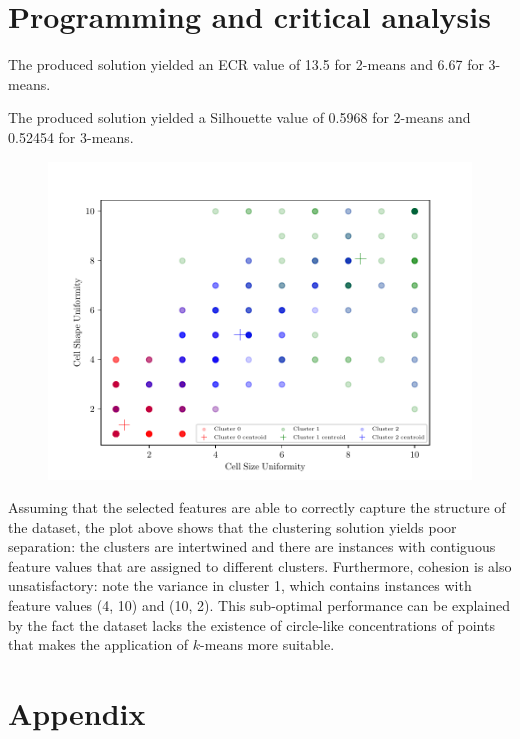 \documentclass{exam}
\begin{document}
    \section{Programming and critical analysis}
    \begin{questions}
        \setcounter{question}{3}
        \item \quad
        \begin{parts}
            \vspace{-1.6em}
            \item The produced solution yielded an ECR value of 13.5 for 2-means and 6.67 for 3-means.
            \item The produced solution yielded a Silhouette value of 0.5968 for 2-means and 0.52454 for 3-means. 
        \end{parts}
        \item \quad
        \vspace{-1.2em}
        \begin{figure}[H]
            \centering
            \includegraphics{3means.pdf}
        \end{figure}
        \item Assuming that the selected features are able to correctly capture the structure of the dataset, the plot above shows that the clustering solution yields poor separation: the clusters are intertwined and there are instances with contiguous feature values that are assigned to different clusters. Furthermore, cohesion is also unsatisfactory: note the variance in cluster 1, which contains instances with feature values (4, 10) and (10, 2). This sub-optimal performance can be explained by the fact the dataset lacks the existence of circle-like concentrations of points that makes the application of $k$-means more suitable. 
    \end{questions}

    \pagebreak
    \section{Appendix}
    \inputminted{python}{src/part02.py}
   
    
    
\end{document}
